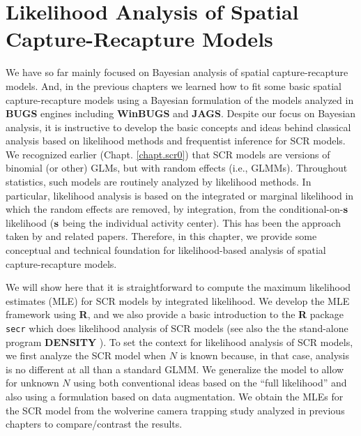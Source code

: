 \chapter{
Likelihood Analysis of Spatial Capture-Recapture Models
}
\label{chapt.mle}

\vspace{.3in}

We have so far mainly focused on Bayesian analysis of spatial
capture-recapture models. And, in the previous chapters we learned how
to fit some basic spatial capture-recapture models using a Bayesian
formulation of the models analyzed in {\bf BUGS} engines including {\bf
  WinBUGS} and {\bf JAGS}.  Despite our focus on Bayesian analysis, it
is instructive to develop the basic concepts and ideas behind
classical analysis based on likelihood methods and frequentist
inference for SCR models. 
We recognized earlier (Chapt. \ref{chapt.scr0}) that SCR
models are versions of binomial (or other) GLMs, but with random
effects (i.e., GLMMs). 
Throughout statistics, such models 
are routinely analyzed by
likelihood methods. In particular, likelihood analysis is based on the
integrated or marginal likelihood in which the random effects are removed, by
integration, from the conditional-on-${\bf s}$ likelihood (${\bf s}$
being the individual activity center). 
This has been the approach taken by
\citet{borchers_efford:2008, dawson_efford:2009} and related papers.
Therefore, in this chapter, we provide some conceptual and technical
foundation for likelihood-based analysis of spatial capture-recapture
models. 



We will show here that it is straightforward to compute the maximum
likelihood estimates (MLE) for SCR models by integrated 
likelihood. We develop the MLE framework using {\bf R}, and we also
provide a basic introduction to the {\bf R} package \mbox{\tt secr}
\citep{efford:2011} which does likelihood analysis of SCR
models (see also the the stand-alone program {\bf DENSITY}
\citep{efford_etal:2004}).  To set the context for likelihood analysis
of SCR models, we first analyze the SCR model  when $N$ is known
because, in that case, analysis is no different at all than a standard
GLMM.
We generalize the model to allow for unknown $N$
using both conventional ideas based on the ``full likelihood''
\citep[e.g.,][]{borchers_etal:2002} and also using a formulation based
on data augmentation.  We obtain the MLEs for the SCR model from the
wolverine camera trapping study \citep{magoun_etal:2011} analyzed in
previous chapters to compare/contrast the results.

